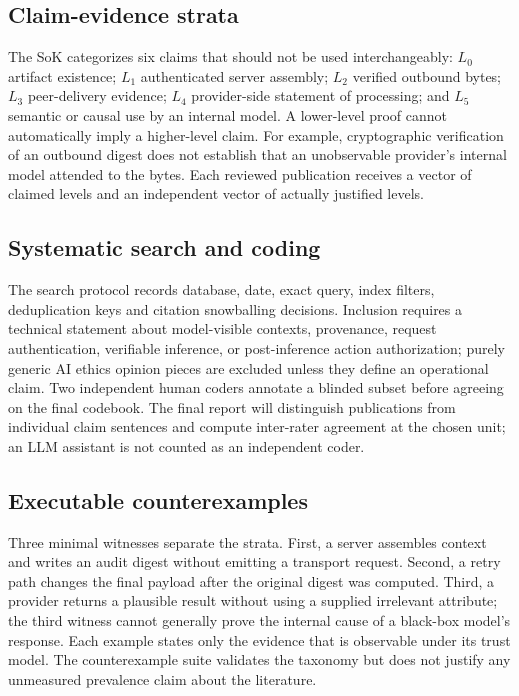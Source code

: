 \documentclass[11pt,a4paper]{article}
\begin{document}
\subsection{Claim-evidence strata}
The SoK categorizes six claims that should not be used interchangeably: $L_0$ artifact existence; $L_1$ authenticated server assembly; $L_2$ verified outbound bytes; $L_3$ peer-delivery evidence; $L_4$ provider-side statement of processing; and $L_5$ semantic or causal use by an internal model. A lower-level proof cannot automatically imply a higher-level claim. For example, cryptographic verification of an outbound digest does not establish that an unobservable provider's internal model attended to the bytes. Each reviewed publication receives a vector of claimed levels and an independent vector of actually justified levels.

\subsection{Systematic search and coding}
The search protocol records database, date, exact query, index filters, deduplication keys and citation snowballing decisions. Inclusion requires a technical statement about model-visible contexts, provenance, request authentication, verifiable inference, or post-inference action authorization; purely generic AI ethics opinion pieces are excluded unless they define an operational claim. Two independent human coders annotate a blinded subset before agreeing on the final codebook. The final report will distinguish publications from individual claim sentences and compute inter-rater agreement at the chosen unit; an LLM assistant is not counted as an independent coder.

\subsection{Executable counterexamples}
Three minimal witnesses separate the strata. First, a server assembles context and writes an audit digest without emitting a transport request. Second, a retry path changes the final payload after the original digest was computed. Third, a provider returns a plausible result without using a supplied irrelevant attribute; the third witness cannot generally prove the internal cause of a black-box model's response. Each example states only the evidence that is observable under its trust model. The counterexample suite validates the taxonomy but does not justify any unmeasured prevalence claim about the literature.
\end{document}
